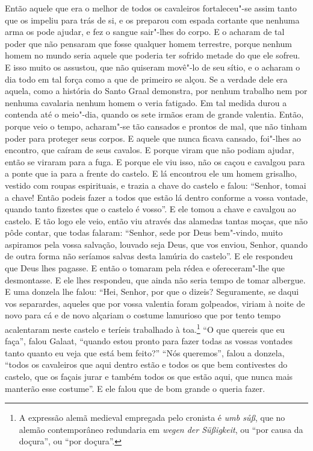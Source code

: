 Então aquele que era o melhor de todos os cavaleiros fortaleceu"-se assim tanto
que os impeliu para trás de si, e os preparou com espada cortante que nenhuma
arma os pode ajudar, e fez o sangue sair"-lhes do corpo. E o acharam de tal
poder que não pensaram que fosse qualquer homem terrestre, porque nenhum homem no
mundo seria aquele que poderia ter sofrido metade do que ele sofreu. E isso
muito os assustou, que não quiseram movê"-lo de seu sítio, e o acharam o dia
todo em tal força como a que de primeiro se alçou. Se a verdade dele era
aquela, como a história do Santo Graal demonstra, por nenhum trabalho nem
por nenhuma cavalaria nenhum homem o veria fatigado. Em tal medida durou a
contenda até o meio"-dia, quando os sete irmãos eram de grande valentia. Então,
porque veio o tempo, acharam"-se tão cansados e prontos de mal, que não tinham
poder para proteger seus corpos. E aquele que nunca ficava cansado, foi"-lhes ao
encontro, que caíram de seus cavalos. E porque viram que não podiam ajudar,
então se viraram para a fuga. E porque ele viu isso, não os caçou e cavalgou
para a ponte que ia para a frente do castelo. E lá encontrou ele um homem
grisalho, vestido com roupas espirituais, e trazia a chave do castelo e falou:
“Senhor, tomai a chave! Então podeis fazer a todos que estão lá dentro conforme
a vossa vontade, quando tanto fizestes que o castelo é vosso”. E ele tomou a
chave e cavalgou ao castelo. E tão logo ele veio, então viu através das
alamedas tantas moças, que não pôde contar, que todas falaram: “Senhor, sede
por Deus bem"-vindo, muito aspiramos pela vossa salvação, louvado seja Deus, que
vos enviou, Senhor, quando de outra forma não seríamos salvas desta lamúria do
castelo”. E ele respondeu que Deus lhes pagasse. E então o tomaram pela rédea e
ofereceram"-lhe que desmontasse. E ele lhes respondeu, que ainda não seria tempo
de tomar albergue. E uma donzela lhe falou: “Hei, Senhor, por que o dizeis?
Seguramente, se daqui vos separardes, aqueles que por vossa valentia foram
golpeados, viriam à noite de novo para cá e de novo alçariam o costume
lamurioso que por tento tempo acalentaram neste castelo e teríeis trabalhado à
toa.\footnote{ A expressão alemã medieval empregada pelo cronista é \textit{umb
sůß}, que no alemão contemporâneo redundaria em \textit{wegen der Süßigkeit},
ou “por causa da doçura”, ou “por doçura”.} “O que quereis que eu
faça”, falou Galaat, “quando estou pronto para fazer todas as vossas vontades
tanto quanto eu veja que está bem feito?” “Nós queremos”, falou a donzela,
“todos os cavaleiros que aqui dentro estão e todos os que bem contivestes do
castelo, que os façais jurar e também todos os que estão aqui, que nunca mais
manterão esse costume”. E ele falou que de bom grande o queria fazer. 

